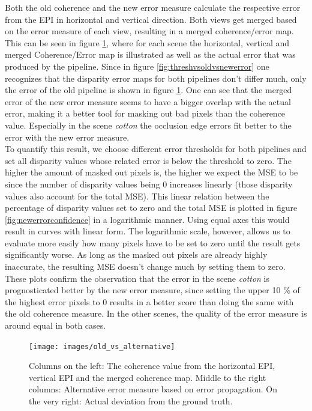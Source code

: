 \documentclass  [
  paper    = a4,
  BCOR     = 10mm,
  twoside,
  fontsize = 12pt,
  fleqn,
  toc      = bibnumbered,
  toc      = listofnumbered,
  numbers  = noendperiod,
  headings = normal,
  listof   = leveldown,
  version  = 3.03
]                                       {scrreprt}
\begin{document}
Both the old coherence and the new error measure calculate the respective error from the EPI in horizontal and vertical direction. Both views get merged based on the error measure of each view, resulting in a merged coherence/error map. This can be seen in figure \ref{fig:oldvsalternative}, where for each scene the horizontal, vertical and merged Coherence/Error map is illustrated as well as the actual error that was produced by the pipeline. Since in figure \ref{fig:threshvsoldvsnewerror} one recognizes that the disparity error maps for both pipelines don't differ much, only the error of the old pipeline is shown in figure \ref{fig:oldvsalternative}. One can see that the merged error of the new error measure seems to have a bigger overlap with the actual error, making it a better tool for masking out bad pixels than the coherence value. Especially in the scene \textit{cotton} the occlusion edge errors fit better to the error with the new error measure.\\
To quantify this result, we choose different error thresholds for both pipelines and set all disparity values whose related error is below the threshold to zero. The higher the amount of masked out pixels is, the higher we expect the MSE to be since the number of disparity values being 0 increases linearly (those disparity values also account for the total MSE). This linear relation between the percentage of disparity values set to zero and the total MSE is plotted in figure \ref{fig:newerrorconfidence} in a logarithmic manner. Using equal axes this would result in curves with linear form. The logarithmic scale, however, allows us to evaluate more easily how many pixels have to be set to zero until the result gets significantly worse. As long as the masked out pixels are already highly inaccurate, the resulting MSE doesn't change much by setting them to zero. These plots confirm the observation that the error in the scene \textit{cotton} is prognosticated better by the new error measure, since setting the upper 10 $\%$ of the highest error pixels to 0 results in a better score than doing the same with the old coherence measure. In the other scenes, the quality of the error measure is around equal in both cases. 
\begin{figure}[h!]
	\centering
	\texttt{[image: images/old\_vs\_alternative]}
	\caption[Old coherence vs new error]{Columns on the left: The coherence value from the horizontal EPI, vertical EPI and the merged coherence map. Middle to the right columns: Alternative error measure based on error propagation. On the very right: Actual deviation from the ground truth.}
	\label{fig:oldvsalternative}
\end{figure}
\end{document}
